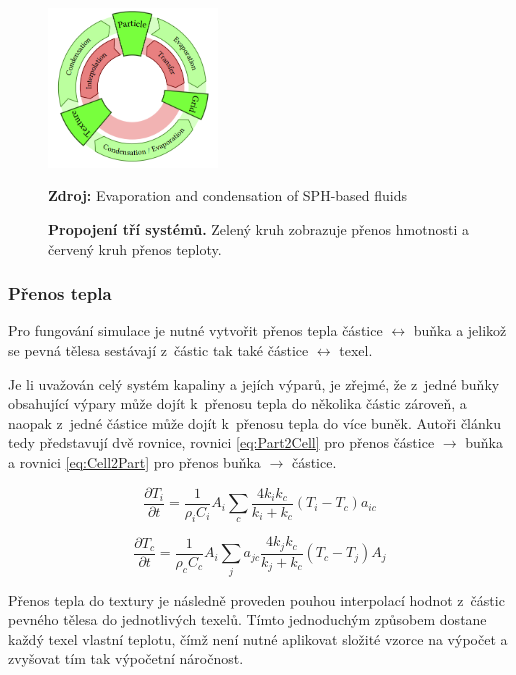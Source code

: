 \begin{figure}[hbt]
	\centering
	\captionsetup{justification=centering}
	\includegraphics[width=0.4\textwidth]{obrazky-figures/evapCycle.PNG}
	\caption{\textbf{Propojení tří systémů.} Zelený kruh zobrazuje přenos hmotnosti a červený kruh přenos teploty.}
	\textbf{Zdroj: } Evaporation and condensation of SPH-based fluids \cite{Evap&Cond}
	\label{fig:EvapCycle}
\end{figure}

\subsubsection{Přenos tepla}
Pro fungování simulace je nutné vytvořit přenos tepla částice $\leftrightarrow$ buňka a jelikož se pevná tělesa sestávají z~částic tak také částice $\leftrightarrow$ texel.

Je li uvažován celý systém kapaliny a jejích výparů, je zřejmé, že z~jedné buňky obsahující výpary může dojít k~přenosu tepla do několika částic zároveň, a naopak z~jedné částice může dojít k~přenosu tepla do více buněk. Autoři článku tedy představují dvě rovnice, rovnici \ref{eq:Part2Cell} pro přenos částice $\rightarrow$ buňka a rovnici \ref{eq:Cell2Part} pro přenos buňka $\rightarrow$ částice.

\begin{equation}
	\frac{\partial T_i}{\partial t} = \frac{1}{\rho_i C_i} A_i \sum_c \frac{4 k_i k_c}{k_i + k_c}(T_i - T_c)a_{ic}
	\label{eq:Part2Cell}
\end{equation}

\begin{equation}
	\frac{\partial T_c}{\partial t} = \frac{1}{\rho_c C_c} A_i \sum_j a_{jc}\frac{4 k_j k_c}{k_j + k_c}(T_c - T_j)A_j
	\label{eq:Cell2Part}
\end{equation}

Přenos tepla do textury je následně proveden pouhou interpolací hodnot z~částic pevného tělesa do jednotlivých texelů. Tímto jednoduchým způsobem dostane každý texel vlastní teplotu, čímž není nutné aplikovat složité vzorce na výpočet a zvyšovat tím tak výpočetní náročnost.

